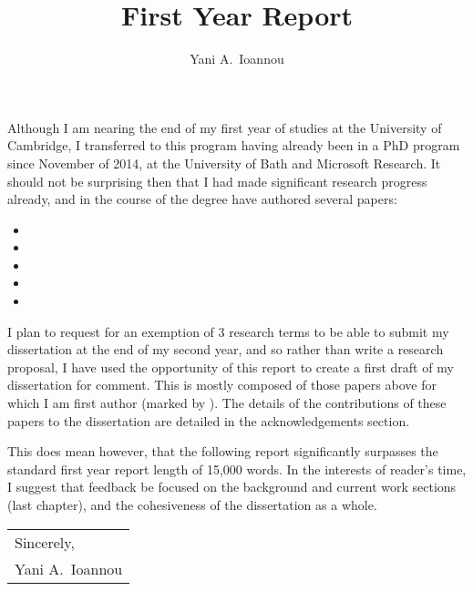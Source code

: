 \documentclass{article}
\begin{document}

\title{First Year Report}
\author{Yani A.~Ioannou}
\maketitle

Although I am nearing the end of my first year of studies at the University of Cambridge, I transferred to this program having already been in a PhD program since November of 2014, at the University of Bath and Microsoft Research. It should not be surprising then that I had made significant research progress already, and in the course of the degree have authored several papers: 

\begin{itemize}
\footnotesize
	\item \footnotemark[1]
	\item \footnotemark[1]
	\item {}
	\item \footnotemark[1]
	\item {}
\end{itemize}


I plan to request for an exemption of 3 research terms to be able to submit my dissertation at the end of my second year, and so rather than write a research proposal, I have used the opportunity of this report to create a first draft of my dissertation for comment. This is mostly composed of those papers above for which I am first author (marked by \footnotemark[1]). The details of the contributions of these papers to the dissertation are detailed in the acknowledgements section.

This does mean however, that the following report significantly surpasses the standard first year report length of 15,000 words. In the interests of reader's time, I suggest that feedback be focused on the background and current work sections (last chapter), and the cohesiveness of the dissertation as a whole.

\bigskip

\null\hfill
\begin{tabular}{l@{}}
  Sincerely, \\[1\normalbaselineskip]
  Yani A.~Ioannou
\end{tabular}
\end{document}
